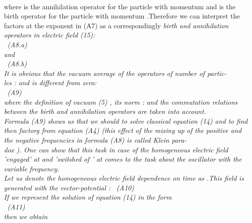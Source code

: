 \documentclass[a4paper,12pt] {article}
\begin{document}
\\ where \coordHE{} is the annihilation  operator for the particle with momentum \coordHE{} and \coordHE{} is the birth operator for the particle with momentum \coordHE{}.Therefore we can
interpret the factors at the exponent in  (A7) as a correspondingly \it birth and annihilation operators in  electric field \rm  (15):
\\\coordHE{} \ (A8.a)\\ and
\\ \coordHE{} \ (A8.b)
\\ It is obvious that the  \it vacuum average of the operators of number of  partic-\\les \rm
 :\coordHE{}  and \coordHE{}  \it  is different from zero\rm :
\\\coordHE{} \ (A9)
\\ where the definition of vacuum (5) , its norm : \coordHE{} and the commutation relations between the birth and annihilation operators  are taken into account.
\\ Formula (A9) shows us that \it  we should to solve classical equation \rm  (14)  \it and to find then
 factor\rm  g  \it from equation \rm  (A4) (this effect of the \it  mixing up of the positive and the negative
 frequencies in  formula \rm (A8) \it is called  Klein para-\\dox \rm ). One can show that this task in  case of
 the homogeneous electric field  'engaged' at \coordHE{} and  'switshed of ' at \coordHE{} comes to
 the \it  task about the oscillator with the variable frequency.\\ \rm Let us denote the homogeneous
electric field dependence on time as \coordHE{}.This field is generated with the vector-potential
\coordHE{} : \coordHE{} \ (A10)\\ If we represent the
 solution of equation (14) in the form \\ \coordHE{} \ (A11)\\ then we obtain \it
\end{document}
